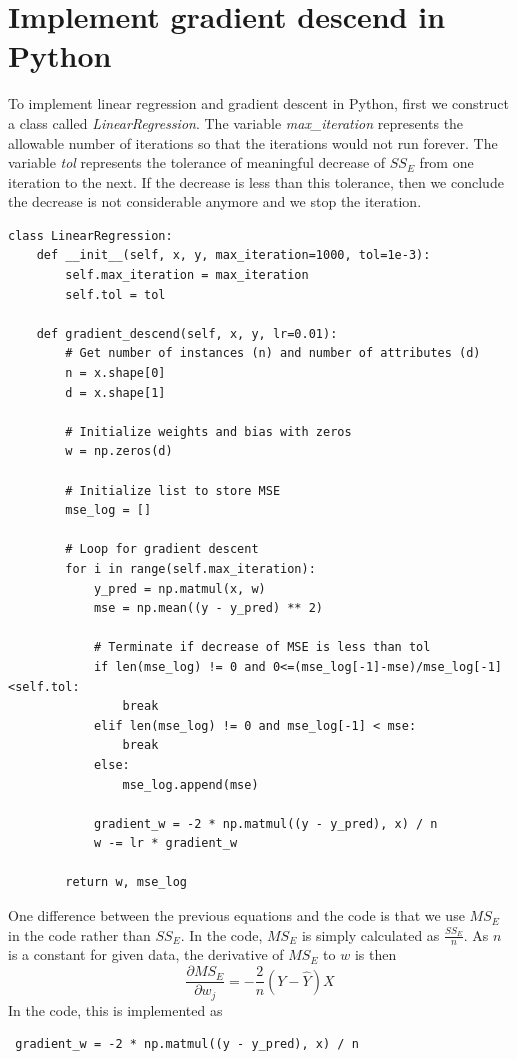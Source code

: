 \documentclass[
	letterpaper
]{article}
\begin{document}
\section{Implement gradient descend in Python}
To implement linear regression and gradient descent in Python, first we construct a class called \textit{LinearRegression}.
The variable \textit{max\_iteration} represents the allowable number of iterations so that the iterations would not run forever.
The variable \textit{tol} represents the tolerance of meaningful decrease of $SS_E$ from one iteration to the next.
If the decrease is less than this tolerance, then we conclude the decrease is not considerable anymore and we stop the iteration.
\begin{lstlisting}
class LinearRegression:
    def __init__(self, x, y, max_iteration=1000, tol=1e-3):
        self.max_iteration = max_iteration
        self.tol = tol
        
    def gradient_descend(self, x, y, lr=0.01):
        # Get number of instances (n) and number of attributes (d)
        n = x.shape[0]
        d = x.shape[1]

        # Initialize weights and bias with zeros
        w = np.zeros(d)

        # Initialize list to store MSE
        mse_log = []

        # Loop for gradient descent
        for i in range(self.max_iteration):
            y_pred = np.matmul(x, w)
            mse = np.mean((y - y_pred) ** 2)

            # Terminate if decrease of MSE is less than tol
            if len(mse_log) != 0 and 0<=(mse_log[-1]-mse)/mse_log[-1]<self.tol:
                break
            elif len(mse_log) != 0 and mse_log[-1] < mse:
                break
            else:
                mse_log.append(mse)

            gradient_w = -2 * np.matmul((y - y_pred), x) / n
            w -= lr * gradient_w

        return w, mse_log
\end{lstlisting}

One difference between the previous equations and the code is that we use $MS_E$ in the code rather than $SS_E$.
In the code, $MS_E$ is simply calculated as $\frac{SS_E}{n}$.
As $n$ is a constant for given data, the derivative of $MS_E$ to $w$ is then
\begin{equation}
\frac{\partial MS_E}{\partial w_j} = -\frac{2}{n} (Y - \hat Y)X
\end{equation}
In the code, this is implemented as 
\begin{lstlisting}
 gradient_w = -2 * np.matmul((y - y_pred), x) / n
\end{lstlisting}
\end{document}
